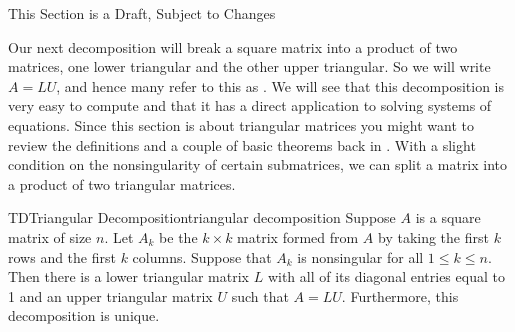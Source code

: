 %
{\sc\large This Section is a Draft, Subject to Changes}\par\bigskip
%
Our next decomposition will break a square matrix into a product of two matrices, one lower triangular and the other upper triangular.  So we will write $A=LU$, and hence many refer to this as .  We will see that this decomposition is very easy to compute and that it has a direct application to solving systems of equations.  Since this section is about triangular matrices you might want to review the definitions and a couple of basic theorems back in .
%
%
With a slight condition on the nonsingularity of certain submatrices, we can split a matrix into a product of two triangular matrices.
%
\begin{theorem}{TD}{Triangular Decomposition}{triangular decomposition}
Suppose $A$ is a square matrix of size $n$.  Let $A_k$ be the $k\times k$ matrix formed from $A$ by taking the first $k$ rows and the first $k$ columns.  Suppose that $A_k$ is nonsingular for all $1\leq k\leq n$.  Then there is a lower triangular matrix $L$ with all of its diagonal entries equal to 1 and an upper triangular matrix $U$ such that $A=LU$.  Furthermore, this decomposition is unique.
\end{theorem}
%
